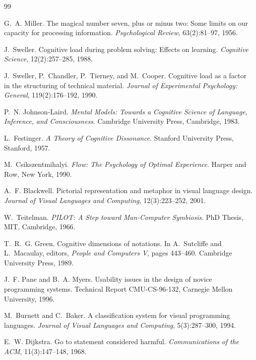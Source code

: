 \documentclass[a4paper,12pt]{article}
\theoremstyle{definition}
\begin{document}
\begin{thebibliography}{99}

G.~A. Miller.
\newblock The magical number seven, plus or minus two: Some limits on our
  capacity for processing information.
\newblock \emph{Psychological Review}, 63(2):81--97, 1956.

J.~Sweller.
\newblock Cognitive load during problem solving: Effects on learning.
\newblock \emph{Cognitive Science}, 12(2):257--285, 1988.

J.~Sweller, P.~Chandler, P.~Tierney, and M.~Cooper.
\newblock Cognitive load as a factor in the structuring of technical material.
\newblock \emph{Journal of Experimental Psychology: General}, 119(2):176--192,
  1990.

P.~N. Johnson-Laird.
\newblock \emph{Mental Models: Towards a Cognitive Science of Language,
  Inference, and Consciousness}.
\newblock Cambridge University Press, Cambridge, 1983.

L.~Festinger.
\newblock \emph{A Theory of Cognitive Dissonance}.
\newblock Stanford University Press, Stanford, 1957.

M.~Csikszentmihalyi.
\newblock \emph{Flow: The Psychology of Optimal Experience}.
\newblock Harper and Row, New York, 1990.

A.~F. Blackwell.
\newblock Pictorial representation and metaphor in visual language design.
\newblock \emph{Journal of Visual Languages and Computing}, 12(3):223--252,
  2001.

W.~Teitelman.
\newblock \emph{PILOT: A Step toward Man-Computer Symbiosis}.
\newblock PhD Thesis, MIT, Cambridge, 1966.

T.~R.~G. Green.
\newblock Cognitive dimensions of notations.
\newblock In A.~Sutcliffe and L.~Macaulay, editors, \emph{People and Computers
  V}, pages 443--460. Cambridge University Press, 1989.

J.~F. Pane and B.~A. Myers.
\newblock Usability issues in the design of novice programming systems.
\newblock Technical Report CMU-CS-96-132, Carnegie Mellon University, 1996.

M.~Burnett and C.~Baker.
\newblock A classification system for visual programming languages.
\newblock \emph{Journal of Visual Languages and Computing}, 5(3):287--300,
  1994.

E.~W. Dijkstra.
\newblock Go to statement considered harmful.
\newblock \emph{Communications of the ACM}, 11(3):147--148, 1968.

\end{thebibliography}
\end{document}
